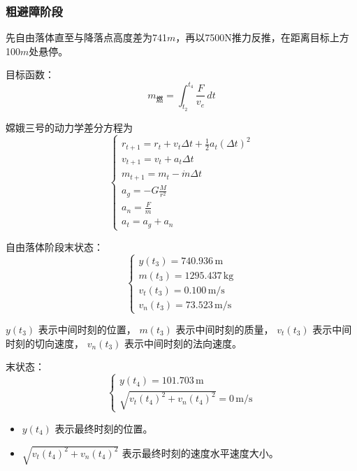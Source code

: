 \documentclass{ctexart}
\begin{document}
\subsubsection{粗避障阶段}
先自由落体直至与降落点高度差为741\(m\)，再以7500N推力反推，在距离目标上方100\(m\)处悬停。

目标函数：
\begin{equation}
m_{\text{燃}} = \int_{t_2}^{t_4} \frac{F}{v_e} \, dt
\end{equation}

嫦娥三号的动力学差分方程为
\[
\begin{cases}
r_{t+1} = r_t + v_t \Delta t + \frac{1}{2} a_t (\Delta t)^2 \\
v_{t+1} = v_t + a_t \Delta t \\
m_{t+1} = m_t - \dot{m} \Delta t \\
a_g = - G \frac{M}{r^2} \\
a_n = \frac{F}{m} \\
a_t = a_g + a_n
\end{cases}
\]

自由落体阶段末状态：
\begin{equation}
\begin{cases}
y(t_3) = 740.936 \, \text{m} \\
m(t_3) = 1295.437 \, \text{kg} \\
v_t(t_3) = 0.100 \, \text{m/s} \\
v_n(t_3) = 73.523 \, \text{m/s}
\end{cases}
\end{equation}


$y(t_3)$ 表示中间时刻的位置，
$m(t_3)$ 表示中间时刻的质量，
$v_t(t_3)$ 表示中间时刻的切向速度，
$v_n(t_3)$ 表示中间时刻的法向速度。

末状态：
\begin{equation}
\begin{cases}
y(t_4) = 101.703 \, \text{m} \\
\sqrt{v_t(t_4)^2 + v_n(t_4)^2} = 0 \, \text{m/s}
\end{cases}
\end{equation}

\begin{itemize}
    \renewcommand\labelitemi{} %
\item $y(t_4)$ 表示最终时刻的位置。
\item $\sqrt{v_t(t_4)^2 + v_n(t_4)^2}$ 表示最终时刻的速度水平速度大小。
\end{itemize}
\end{document}

